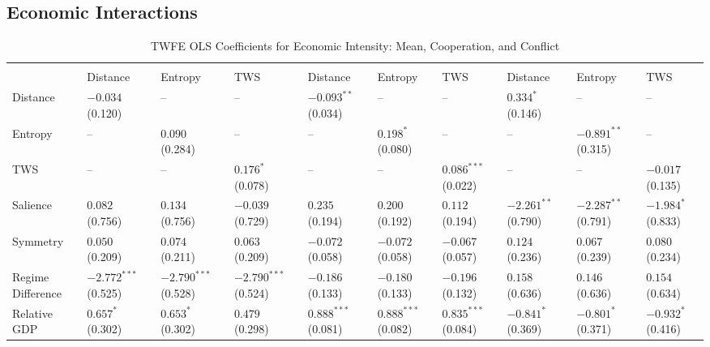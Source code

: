 \documentclass[12pt]{article}
\begin{document}
\subsection{Economic Interactions}
\begin{table}[htbp]\scriptsize
\centering
\caption{TWFE OLS Coefficients for Economic Intensity: Mean, Cooperation, and Conflict}
\renewcommand{\arraystretch}{1.2}
\begin{tabularx}{\textwidth}{
  l
  >{\centering\arraybackslash}X >{\centering\arraybackslash}X >{\centering\arraybackslash}X
  >{\centering\arraybackslash}X >{\centering\arraybackslash}X >{\centering\arraybackslash}X
  >{\centering\arraybackslash}X >{\centering\arraybackslash}X >{\centering\arraybackslash}X
}
\toprule
\rowcolor{gray!20}
 & \multicolumn{3}{c}{\textbf{Mean}} 
 & \multicolumn{3}{c}{\textbf{Cooperation}} 
 & \multicolumn{3}{c}{\textbf{Conflict}} \\
\cmidrule(lr){2-4} \cmidrule(lr){5-7} \cmidrule(lr){8-10}
 & Distance & Entropy & TWS & Distance & Entropy & TWS & Distance & Entropy & TWS \\
\midrule
Distance & $-0.034^{}$ (0.120) & -- & -- & $-0.093^{**}$ (0.034) & -- & -- & $0.334^{*}$ (0.146) & -- & -- \\
Entropy & -- & $0.090^{}$ (0.284) & -- & -- & $0.198^{*}$ (0.080) & -- & -- & $-0.891^{**}$ (0.315) & -- \\
TWS & -- & -- & $0.176^{*}$ (0.078) & -- & -- & $0.086^{***}$ (0.022) & -- & -- & $-0.017^{}$ (0.135) \\
Salience & $0.082^{}$ (0.756) & $0.134^{}$ (0.756) & $-0.039^{}$ (0.729) & $0.235^{}$ (0.194) & $0.200^{}$ (0.192) & $0.112^{}$ (0.194) & $-2.261^{**}$ (0.790) & $-2.287^{**}$ (0.791) & $-1.984^{*}$ (0.833) \\
Symmetry & $0.050^{}$ (0.209) & $0.074^{}$ (0.211) & $0.063^{}$ (0.209) & $-0.072^{}$ (0.058) & $-0.072^{}$ (0.058) & $-0.067^{}$ (0.057) & $0.124^{}$ (0.236) & $0.067^{}$ (0.239) & $0.080^{}$ (0.234) \\
Regime Difference & $-2.772^{***}$ (0.525) & $-2.790^{***}$ (0.528) & $-2.790^{***}$ (0.524) & $-0.186^{}$ (0.133) & $-0.180^{}$ (0.133) & $-0.196^{}$ (0.132) & $0.158^{}$ (0.636) & $0.146^{}$ (0.636) & $0.154^{}$ (0.634) \\
Relative GDP & $0.657^{*}$ (0.302) & $0.653^{*}$ (0.302) & $0.479^{}$ (0.298) & $0.888^{***}$ (0.081) & $0.888^{***}$ (0.082) & $0.835^{***}$ (0.084) & $-0.841^{*}$ (0.369) & $-0.801^{*}$ (0.371) & $-0.932^{*}$ (0.416) \\

\end{tabularx}
\end{table}
\end{document}
